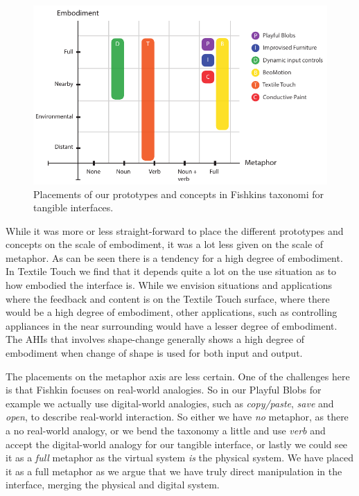 \begin{figure}[h]
  \centering
  \includegraphics[width=.9\textwidth]{figures/adhoc2/fishkin.pdf}
  \caption{Placements of our prototypes and concepts in Fishkins taxonomi for tangible interfaces.}
  \label{fig:ch:adhoc2:fishkin}
\end{figure}

While it was more or less straight-forward to place the different prototypes and concepts on the scale of embodiment, it was a lot less given on the scale of metaphor.
As can be seen there is a tendency for a high degree of embodiment.
In Textile Touch we find that it depends quite a lot on the use situation as to how embodied the interface is.
While we envision situations and applications where the feedback and content is on the Textile Touch surface, where there would be a high degree of embodiment, other applications, such as controlling appliances in the near surrounding would have a lesser degree of embodiment.
The AHIs that involves shape-change generally shows a high degree of embodiment when change of shape is used for both input and output.

The placements on the metaphor axis are less certain.
One of the challenges here is that Fishkin focuses on real-world analogies.
So in our Playful Blobs for example we actually use digital-world analogies, such as \emph{copy/paste}, \emph{save} and \emph{open}, to describe real-world interaction.
So either we have \emph{no} metaphor, as there a no real-world analogy, or we bend the taxonomy a little and use \emph{verb} and accept the digital-world analogy for our tangible interface, or lastly we could see it as a \emph{full} metaphor as the virtual system \emph{is} the
physical system. 
We have placed it as a full metaphor as we argue that we have truly direct manipulation in the interface, merging the physical and digital system.


